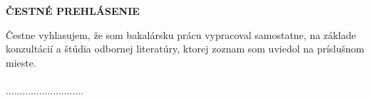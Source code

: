 
\newpage
\cleardoublepage
\thispagestyle{plain}
\vspace*{15cm} 
\begin{large}
\noindent
\textbf{ČESTNÉ PREHLÁSENIE} \\
\end{large}
\noindent
Čestne vyhlasujem, že som bakalársku prácu vypracoval samostatne, na základe
konzultácií a štúdia odbornej literatúry, ktorej zoznam som uviedol na príslušnom mieste.
\\
\vspace*{0.5cm}\\
\hspace*{10cm}............................\\
\hspace*{10.7cm} \Author

\iffalse
\newpage
\cleardoublepage
\thispagestyle{plain}
\begin{large}
	\noindent
	\textbf{POĎAKOVANIE} \\
\end{large}
\noindent
\fi
